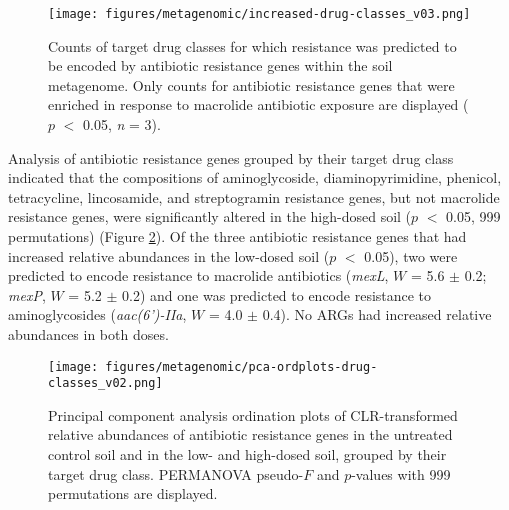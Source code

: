 \begin{figure}[htpb]
	\centering
		\texttt{[image: figures/metagenomic/increased-drug-classes\_v03.png]}
	\caption[Counts of target drug classes for enriched metagenomic antibiotic resistance genes.]{
		Counts of target drug classes for which resistance was predicted to be encoded by antibiotic resistance genes within the soil metagenome.
		Only counts for antibiotic resistance genes that were enriched in response to macrolide antibiotic exposure are displayed ($p$ $<$ 0.05, \textit{n} = 3).
	}
	\label{fig:increased-drug-classes}
\end{figure}

Analysis of antibiotic resistance genes grouped by their target drug class indicated that the compositions of aminoglycoside, diaminopyrimidine, phenicol, tetracycline, lincosamide, and streptogramin resistance genes, but not macrolide resistance genes, were significantly altered in the high-dosed soil ($p$ $<$ 0.05, 999 permutations) (Figure \ref{fig:pca-ordplots-drug-classes}).
Of the three antibiotic resistance genes that had increased relative abundances in the low-dosed soil ($p$ $<$ 0.05), two were predicted to encode resistance to macrolide antibiotics (\textit{mexL}, $W$ = 5.6 $\pm$ 0.2; \textit{mexP}, $W$ = 5.2 $\pm$ 0.2) and one was predicted to encode resistance to aminoglycosides (\textit{aac(6’)-IIa}, $W$ = 4.0 $\pm$ 0.4). No ARGs had increased relative abundances in both doses.

\begin{figure}[htpb]
	\centering
		\texttt{[image: figures/metagenomic/pca-ordplots-drug-classes\_v02.png]}
	\caption[Principal component analysis ordination plots of metagenomic antibiotic resistance genes grouped by target drug class.]{
		Principal component analysis ordination plots of CLR-transformed relative abundances of antibiotic resistance genes in the untreated control soil and in the low- and high-dosed soil, grouped by their target drug class.
		PERMANOVA pseudo-$F$ and $p$-values with 999 permutations are displayed.
	}
	\label{fig:pca-ordplots-drug-classes}
\end{figure}

